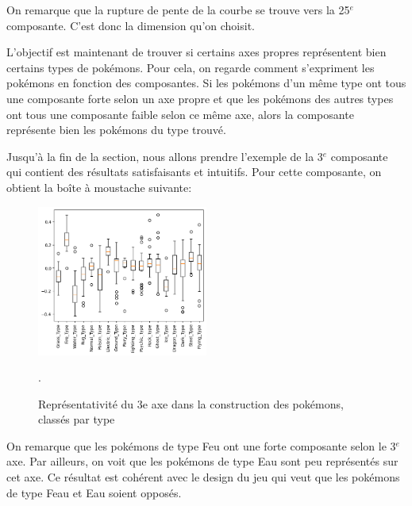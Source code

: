 \documentclass[a4paper,12pt]{article}
\begin{document}
On remarque que la rupture de pente de la courbe se trouve vers la 25$^{e}$ composante. C'est donc la dimension qu'on choisit.

L'objectif est maintenant de trouver si certains axes propres représentent bien certains types de pokémons. Pour cela, on regarde comment s'expriment les pokémons en fonction des composantes. Si les pokémons d'un même type ont tous une composante forte selon un axe propre et que les pokémons des autres types ont tous une composante faible selon ce même axe, alors la composante représente bien les pokémons du type trouvé. 

Jusqu'à la fin de la section, nous allons prendre l'exemple de la 3$^{e}$ composante qui contient des résultats satisfaisants et intuitifs. Pour cette composante, on obtient la boîte à moustache suivante: 
\begin{figure}[!h]
    \centering
    \includegraphics[width=0.5\textwidth]{moustache_MCA.png}
    \caption{Représentativité du 3e axe dans la construction des pokémons, classés par type}.
\end{figure}

On remarque que les pokémons de type Feu ont une forte composante selon le 3$^{e}$ axe. Par ailleurs, on voit que les pokémons de type Eau sont peu représentés sur cet axe. Ce résultat est cohérent avec le design du jeu qui veut que les pokémons de type Feau et Eau soient opposés. 
\end{document}
